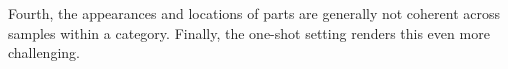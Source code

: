 \documentclass[10pt,twocolumn,letterpaper]{article}
\newcommand{\dataset}{\mbox{DiPART}}
\begin{document}
Fourth, the appearances and locations of parts are generally not coherent across samples within a category. Finally, the one-shot setting renders this even more challenging.
\end{document}
